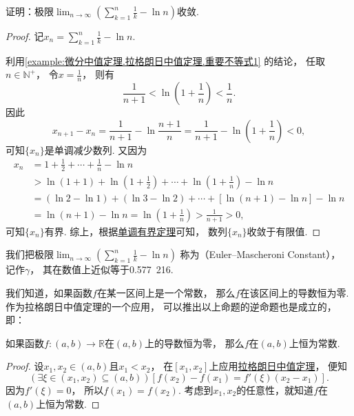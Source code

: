 \begin{example}\label{example:微分中值定理.拉格朗日中值定理.欧拉--马歇罗尼常数}
证明：极限\(\lim_{n\to\infty} \left(\sum_{k=1}^n \frac{1}{k} - \ln n\right)\)收敛.
\begin{proof}
记\(x_n = \sum_{k=1}^n \frac{1}{k} - \ln n\).

利用\cref{example:微分中值定理.拉格朗日中值定理.重要不等式1} 的结论，
任取\(n\in\mathbb{N}^+\)，
令\(x=\frac{1}{n}\)，
则有\begin{equation*}
	\frac{1}{n+1} < \ln(1+\frac{1}{n}) < \frac{1}{n}.
\end{equation*}
因此\begin{equation*}
	x_{n+1} - x_n = \frac{1}{n+1} - \ln\frac{n+1}{n}
	= \frac{1}{n+1} - \ln(1+\frac{1}{n}) < 0,
\end{equation*}
可知\(\{x_n\}\)是单调减少数列.
又因为\begin{align*}
	x_n &= 1 + \frac{1}{2} + \dotsb + \frac{1}{n} - \ln n \\
	&> \ln(1+1) + \ln(1+\frac{1}{2}) + \dotsb + \ln(1+\frac{1}{n}) - \ln n \\
	&= (\ln2-\ln1)+(\ln3-\ln2)+\dotsb+[\ln(n+1)-\ln n] - \ln n \\
	&= \ln(n+1) - \ln n
	= \ln(1+\frac{1}{n})
	> \frac{1}{n+1} > 0,
\end{align*}
可知\(\{x_n\}\)有界.
综上，根据\hyperref[theorem:极限.函数的单调有界定理]{单调有界定理}可知，
数列\(\{x_n\}\)收敛于有限值.
\end{proof}
\end{example}
\begin{remark}
我们把极限\(\lim_{n\to\infty} \left(\sum_{k=1}^n \frac{1}{k} - \ln n\right)\)
称为（Euler--Mascheroni Constant），
记作\(\gamma\)，
其在数值上近似等于{0.577~216}.
\end{remark}

我们知道，如果函数\(f\)在某一区间上是一个常数，
那么\(f\)在该区间上的导数恒为零.作为拉格朗日中值定理的一个应用，
可以推出以上命题的逆命题也是成立的，即：
\begin{theorem}
如果函数\(f\colon(a,b)\to\mathbb{R}\)在\((a,b)\)上的导数恒为零，
那么\(f\)在\((a,b)\)上恒为常数.
\begin{proof}
设\(x_1,x_2\in(a,b)\)且\(x_1<x_2\)，
在\([x_1,x_2]\)上应用\hyperref[theorem:微分中值定理.拉格朗日中值定理]{拉格朗日中值定理}，
便知\begin{equation*}
	(\exists\xi\in(x_1,x_2)\subseteq(a,b))
	[f(x_2) - f(x_1) = f'(\xi) (x_2 - x_1)].
\end{equation*}
因为\(f'(\xi) = 0\)，
所以\(f(x_1) = f(x_2)\).
考虑到\(x_1,x_2\)的任意性，就知道\(f\)在\((a,b)\)上恒为常数.
\end{proof}
\end{theorem}

